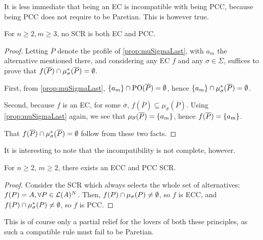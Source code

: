 \documentclass[version=3.21, pagesize, twoside=off, bibliography=totoc, DIV=calc, fontsize=12pt, a4paper]{scrartcl}
\begin{document}
It is less immediate that being an EC is incompatible with being PCC, because being PCC does not require to be Paretian. This is however true.

\begin{proposition} \label{prop:incompatibility} 
	For $n ≥ 2, m ≥ 3$, no SCR is both EC and PCC.
\end{proposition}
\begin{proof}
	\newcommand{\Ptop}{\overline{P}}
	\newcommand{\sigmatop}{\overline{\sigma}}
	
	Letting $\Ptop$ denote the profile of \cref{prop:muSigmaLast}, with $a_m$ the alternative mentioned there, and considering any EC $f$ and any $\sigma \in \Sigma$, suffices to prove that $f(\Ptop) \cap \mustar(\Ptop) = \emptyset$.
	
	First, from \cref{prop:muSigmaLast}, $\set{a_m} \cap \paretopt(\Ptop) = \emptyset$, hence $\set{a_m} \cap \mustar(\Ptop) = \emptyset$.
	
	Second, because $f$ is an EC, for some $\sigmatop$, $f(\Ptop) \subseteq \mu_{\sigmatop}(\Ptop)$. Using \cref{prop:muSigmaLast} again, we see that $\mu_{\sigmatop}(\Ptop) = \set{a_m}$, hence $f(\Ptop) = \set{a_m}$.
	
	That $f(\Ptop) \cap \mustar(\Ptop) = \emptyset$ follow from these two facts.
\end{proof}

It is interesting to note that the incompatibility is not complete, however.

\begin{remark}
	For $n ≥ 2$, $m ≥ 2$, there exists an ECC and PCC SCR.
\end{remark}
\begin{proof}
	Consider the SCR which always selects the whole set of alternatives: $f(P)=A, \forall P \in \mathcal{L}(A)^N$. Then, $f(P) \cap \mu_{\sigma}(P) \neq \emptyset$, so $f$ is ECC, and $f(P) \cap \mu_{\sigma}^*(P) \neq \emptyset$, so $f$ is PCC.
\end{proof}
This is of course only a partial relief for the lovers of both these principles, as such a compatible rule must fail to be Paretian.
\end{document}
